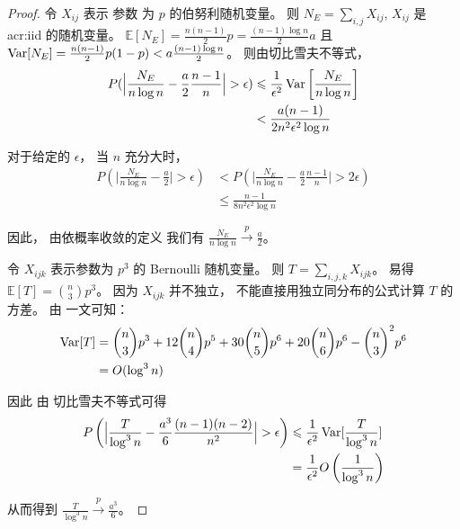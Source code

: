 \begin{proof}
		令 $X_{ij}$ 表示
    参数 为 $p$ 的伯努利随机变量。
    则 $N_E
    = \sum_{i,j} X_{ij}$, $X_{ij}$ 是 \gls{acr:iid}
    的随机变量。
	$\mathbb{E}[N_E] = \frac{n(n-1)}{2}p = \frac{(n-1)\log n}{2}a$ 
  且  $\operatorname{\mathrm{Var}}[N_E] = \frac{n(n-1)}{2} p(1-p) < a\frac{(n-1)\log n}{2}$。
	则由切比雪夫不等式，
	\begin{align*}
	P(\Big|\frac{N_E}{n \log n } - \frac{a}{2} \frac{n-1}{n}\Big| > \epsilon) & \leqslant
	\frac{1}{\epsilon^2}\operatorname{\mathrm{Var}} \left[\frac{N_E } {n \log n } \right] \\
	& < \frac{a(n-1)}{2n^2\epsilon^2\log n}
	\end{align*}
	
	对于给定的 $\epsilon$， 当 $n$ 充分大时，
  \begin{align*}
	P \left(\Big|\frac{N_E}{n \log n } - \frac{a}{2} \Big| > \epsilon \right) & <
	P \left(\Big|\frac{N_E}{n \log n } - \frac{a}{2} \frac{n-1}{n}\Big| > 2\epsilon \right) \\
	& \leq \frac{n-1}{8n^2 \epsilon^2 \log n}
	\end{align*}
	
	因此， 由依概率收敛的定义
  我们有 $\frac{N_E}{n \log n} \xrightarrow{p} \frac{a}{2}$。
	
	令 $X_{ijk}$ 表示参数为  $p^3$ 的 Bernoulli 随机变量。
	则 $T = \sum_{i,j,k} X_{ijk}$。
	易得 $\mathbb{E}[T] = \binom{n}{3}p^3$。
  因为 $X_{ijk}$ 并不独立，
  不能直接用独立同分布的公式计算 $T$ 的方差。
	由  \citet{holland1977method} 一文可知：
	\begin{align*}
	\operatorname{\mathrm{Var}}[T]  &= \binom{n}{3} p^3 + 12 \binom{n}{4} p^5 + 30 \binom{n}{5} p^6 + 20 \binom{n}{6} p^6
	 - \binom{n}{3}^2 p^6  \\ 
   &= O(\log^3 n)
	\end{align*}
	
	因此
	由 切比雪夫不等式可得
	\begin{align*}
	P \left (\Big|\frac{T}{\log^3 n } - \frac{a^3}{6} \frac{(n-1)(n-2)}{n^2}\Big| > \epsilon \right)
   &\leqslant \frac{1}{\epsilon^2} \operatorname{\mathrm{Var}}[ \frac{T}{\log^3 n} ]\\ 
	& = \frac{1}{\epsilon^2}O \left(\frac{1}{\log^3 n} \right)
	\end{align*}
	    
	从而得到 $\frac{T}{\log^3 n} \xrightarrow{p} \frac{a^3}{6}$。
\end{proof}

